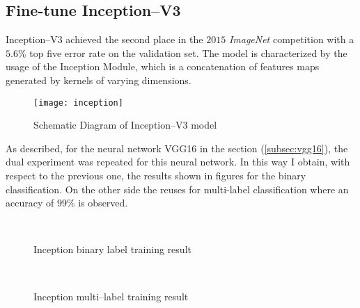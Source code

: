 \subsection{Fine-tune Inception--V3}
\label{subsec:inception}
Inception--V3 achieved the second place in the $2015$ \emph{ImageNet} 
competition with a $5.6 \%$ top five error rate on the validation set. 
The model is characterized by the usage of the Inception Module, which is a 
concatenation of features maps generated by kernels of varying dimensions.
%
\begin{figure}[htb]
\centering
\texttt{[image: inception]}
\caption{Schematic Diagram of Inception--V3 model}
\label{fig:inceptionV3schema}
\end{figure}
%
As described, for the neural network VGG16 in the section (\ref{subsec:vgg16}), 
the dual experiment was repeated for this neural network.
In this way I obtain, with respect to the previous one, the results shown in figures
for the binary classification.
On the other side the reuses for multi-label classification where an accuracy of $99\%$ is observed.
%
\begin{figure}[htb]
\centering
{} \quad
{} \\
\caption{Inception binary label training result}
\label{fig:inception-result-bin}
\end{figure}
%
\begin{figure}[htb]
\centering
{} \quad
{} \\
\caption{Inception multi--label training result}
\label{fig:inception-result-multi}
\end{figure}
%
